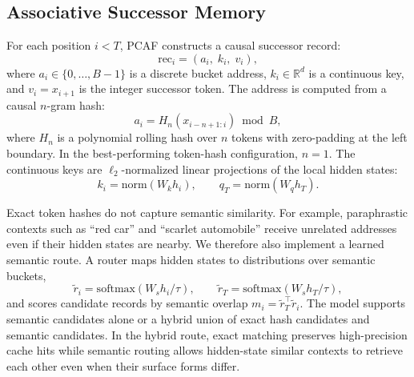 \documentclass[11pt]{article}
\begin{document}
\subsection{Associative Successor Memory}

For each position $i < T$, PCAF constructs a causal successor record:
\begin{equation}
  \mathrm{rec}_i = (a_i,\; k_i,\; v_i),
\end{equation}
where $a_i \in \{0,\ldots,B-1\}$ is a discrete bucket address,
$k_i \in \mathbb{R}^d$ is a continuous key, and $v_i = x_{i+1}$ is the integer
successor token. The address is computed from a causal $n$-gram hash:
\begin{equation}
  a_i = H_n(x_{i-n+1:i}) \bmod B,
\end{equation}
where $H_n$ is a polynomial rolling hash over $n$ tokens with zero-padding at
the left boundary. In the best-performing token-hash configuration, $n=1$. The
continuous keys are $\ell_2$-normalized linear projections of the local hidden
states:
\begin{equation}
  k_i = \mathrm{norm}(W_k h_i), \qquad q_T = \mathrm{norm}(W_q h_T).
\end{equation}

Exact token hashes do not capture semantic similarity. For example,
paraphrastic contexts such as ``red car'' and ``scarlet automobile'' receive
unrelated addresses even if their hidden states are nearby. We therefore also
implement a learned semantic route. A router maps hidden states to distributions
over semantic buckets,
\begin{equation}
  \tilde{r}_i = \mathrm{softmax}(W_s h_i / \tau), \qquad
  \tilde{r}_T = \mathrm{softmax}(W_s h_T / \tau),
\end{equation}
and scores candidate records by semantic overlap
$m_i = \tilde{r}_T^\top \tilde{r}_i$. The model supports semantic candidates
alone or a hybrid union of exact hash candidates and semantic candidates. In the
hybrid route, exact matching preserves high-precision cache hits while semantic
routing allows hidden-state similar contexts to retrieve each other even when
their surface forms differ.
\end{document}
